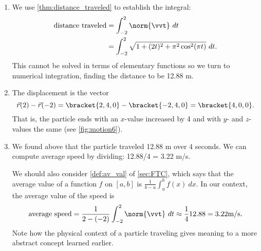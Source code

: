 {\begin{enumerate}
	\item We use \autoref{thm:distance_traveled} to establish the integral:
	{%
	}%
	\begin{align*}
	\text{distance traveled}
	&= \int_{-2}^2 \norm{\vvt}\ dt \\
	&= \int_{-2}^2 \sqrt{1+(2t)^2+ \pi^2\cos^2(\pi t)}\ dt.
	\end{align*}
	This cannot be solved in terms of elementary functions so we turn to numerical integration, finding the distance to be 12.88 m.
		
	\item	The displacement is the vector
	\[\vec r(2)-\vec r(-2) =\bracket{2,4,0}-\bracket{-2,4,0}=\bracket{4,0,0}.\]
	That is, the particle ends with an $x$-value increased by 4 and with $y$- and $z$-values the same (see \autoref{fig:motion6}).
	
	\item	We found above that the particle traveled 12.88 m over 4 seconds. We can compute average speed by dividing: 12.88/4 = 3.22 m/s. 
	
	We should also consider \autoref{def:av_val} of \autoref{sec:FTC}, which says that the average value of a function $f$ on $[a,b]$ is $\frac{1}{b-a}\int_a^b f(x)\ dx$. In our context, the average value of the speed is
	\[
	\text{average speed} = \frac{1}{2-(-2)}\int_{-2}^2 \norm{\vvt}\ dt \approx \frac14 12.88 = 3.22\text{m/s}.
	\]
	Note how the physical context of a particle traveling gives meaning to a more abstract concept learned earlier.\eoehere
\end{enumerate}}

